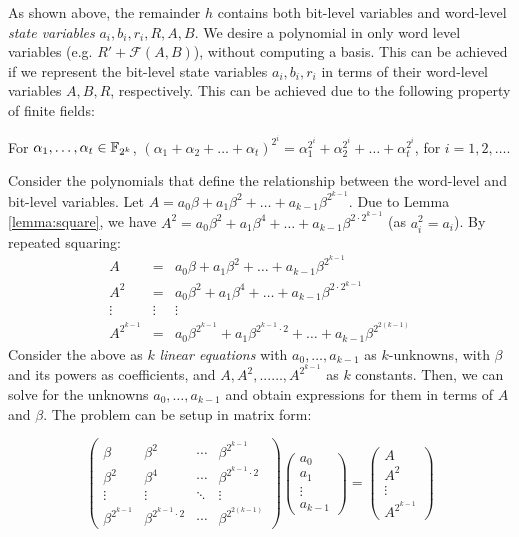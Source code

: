 \vspace{-0.1in}
As shown above, the remainder $h$ contains both bit-level variables and
word-level {\it state variables} $a_i, b_i, r_i, R, A, B$. We desire
a polynomial in only word 
level variables (e.g. $R'+\mathcal{F}(A,B)$), without computing a
\Grobner basis. This can be achieved if we  represent the
bit-level state variables $a_i, b_i, r_i$ in terms of their word-level
variables $A, B, R$, respectively. This can be achieved due to 
the following property of finite fields:

\begin{Lemma}
\label{lemma:square}
For $\alpha_1, \dots, \alpha_t \in {\mathbb{F}}_{2^k}$, $(\alpha_1 + \alpha_2 +
\dots + \alpha_t)^{2^i} = \alpha_1^{2^i} + \alpha_2^{2^i} + \dots +
\alpha_t^{2^i}$, for $i = 1, 2, \ldots$. 
\end{Lemma}

Consider the polynomials that define the relationship between the
word-level and bit-level variables. Let 
$ A = a_0 \beta + a_1\beta^2 + \dots + a_{k-1}\beta^{2^{k-1}}$.
Due to Lemma \ref{lemma:square}, we have $A^2 = a_0 \beta^{2}+ a_1
\beta^{4} + \dots + a_{k-1} \beta^{2\cdot 2^{k-1}}$ (as
$a_i^2 = a_i$). By repeated squaring:
\begin{eqnarray}
A & = & a_0 \beta + a_1\beta^2 + \dots + a_{k-1}\beta^{2^{k-1}}\nonumber\\
A^2 & = & a_0 \beta^{2}+ a_1 \beta^{4} + \dots + a_{k-1}
\beta^{2\cdot 2^{k-1}} \nonumber\\
\vdots & \vdots& \vdots \nonumber\\
A^{2^{k-1}} & = & a_0 \beta^{2^{k-1}}  +  a_1 \beta^{2^{k-1}\cdot 2} +
\dots + a_{k-1}\beta^{2^{2(k-1)}} \nonumber
\end{eqnarray}
Consider the above as $k$ {\it linear equations} with $a_0, \dots, a_{k-1}$
as $k$-unknowns, with $\beta$ and its powers as coefficients, and 
$A, A^2, ... \dots, A^{2^{k-1}}$ as $k$ constants. Then, we can solve
for the unknowns $a_0, \dots, a_{k-1}$ and obtain expressions for them
in terms of $A$ and $\beta$. The problem can be setup in
matrix form:

\begin{displaymath}
\begin{pmatrix}
\beta & \beta^2 & \cdots & \beta^{2^{k-1}} \\
\beta^2 & \beta^4 & \cdots & \beta^{2^{k-1}\cdot 2} \\
\vdots & \vdots & \ddots & \vdots \\
\beta^{2^{k-1}} & \beta^{2^{k-1}\cdot 2} & \cdots & \beta^{2^{2(k-1)}}
\end{pmatrix}
\begin{pmatrix}
a_0\\
a_1\\
\vdots\\
a_{k-1}
\end{pmatrix}
=
\begin{pmatrix}
A\\
A^2\\
\vdots\\
A^{2^{k-1}}
\end{pmatrix}
\end{displaymath}

